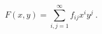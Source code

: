 \begin{equation}
F(x,y) = \sum\limits_{i,j=1}^{\infty} f_{ij} x^i y^j\ .
\label{2.3}
\end{equation}


